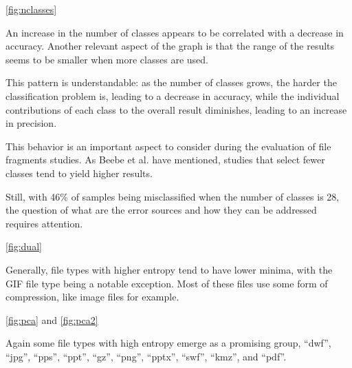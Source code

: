 
\ref{fig:nclasses}

An increase in the number of classes appears to be  correlated with a decrease in accuracy. Another relevant aspect of the graph is that the range of the results seems to be smaller when more classes are used.  

This pattern is understandable: as the number of classes grows, the harder the classification problem is, leading to a decrease in accuracy, while the individual contributions of each class to the overall result diminishes, leading to an increase in precision.

This behavior is an important aspect to consider during the evaluation of file fragments studies. As Beebe et al. \cite{beebe_sceadan:_2013} have mentioned, studies that select fewer classes tend to yield higher results. 

Still, with 46\%  of samples being misclassified when the number of classes is 28, the question of what are the error sources and how they can be addressed requires attention.


\ref{fig:dual}

Generally, file types with higher entropy tend to have lower minima, with the GIF  file type being a notable exception. Most of these files use some form of compression, like image files for example. 


\ref{fig:pca} and \ref{fig:pca2}

Again some file types with high entropy emerge as a promising group,  ``dwf'',
``jpg'',
``pps'',
``ppt'',
``gz'',
``png'',
``pptx'',
``swf'',
``kmz'',
and ``pdf''.
